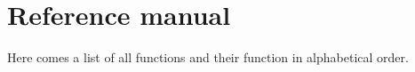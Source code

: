 
\part{Reference manual}


Here comes a list of all functions and their function in alphabetical order.

